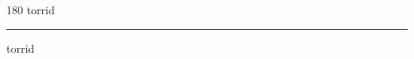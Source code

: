 
\begin{frame}
\begin{center}
\begin{turn}{180}
{\fontsize{2.5cm}{1em}\selectfont torrid}
\end{turn}
\vspace{1em}\par  
\hrule
\vspace{1em}\par  
{\fontsize{2.5cm}{1em}\selectfont torrid}
\end{center}
\end{frame}
